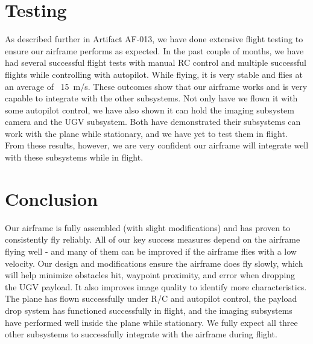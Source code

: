 \documentclass[]{auvsi_doc}
\begin{document}
\section{Testing}
As described further in Artifact AF-013, we have done extensive flight testing to ensure our airframe performs as expected. In the past couple of months, we have had several successful flight tests with manual RC control and multiple successful flights while controlling with autopilot. While flying, it is very stable and flies at an average of ~15\ m/s. These outcomes show that our airframe works and is very capable to integrate with the other subsystems. Not only have we flown it with some autopilot control, we have also shown it can hold the imaging subsystem camera and the UGV subsystem. Both have demonstrated their subsystems can work with the plane while stationary, and we have yet to test them in flight. From these results, however, we are very confident our airframe will integrate well with these subsystems while in flight.

\section{Conclusion}
Our airframe is fully assembled (with slight modifications) and has proven to consistently fly reliably. All of our key success measures depend on the airframe flying well - and many of them can be improved if the airframe flies with a low velocity. Our design and modifications ensure the airframe does fly slowly, which will help minimize obstacles hit, waypoint proximity, and error when dropping the UGV payload. It also improves image quality to identify more characteristics. The plane has flown successfully under R/C and autopilot control, the payload drop system has functioned successfully in flight, and the imaging subsystems have performed well inside the plane while stationary. We fully expect all three other subsystems to successfully integrate with the airframe during flight.
\end{document}

